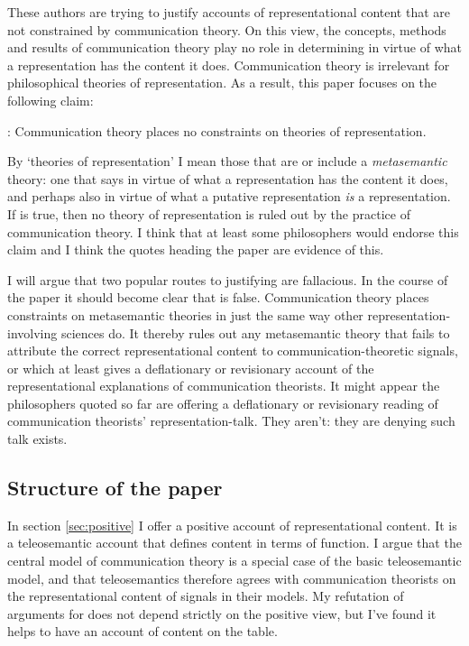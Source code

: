 \documentclass[12pt]{article}
\begin{document}
These authors are trying to justify accounts of representational content that are not constrained by communication theory.
On this view, the concepts, methods and results of communication theory play no role in determining in virtue of what a representation has the content it does.
Communication theory is irrelevant for philosophical theories of representation.
As a result, this paper focuses on the following claim:

\begin{myquote}
\tic{}: Communication theory places no constraints on theories of representation.
\end{myquote}

\noindent By `theories of representation' I mean those that are or include a \textit{metasemantic} theory: one that says in virtue of what a representation has the content it does, and perhaps also in virtue of what a putative representation \textit{is} a representation.
If \tic{} is true, then no theory of representation is ruled out by the practice of communication theory.
I think that at least some philosophers would endorse this claim and I think the quotes heading the paper are evidence of this.

I will argue that two popular routes to justifying \tic{} are fallacious.
In the course of the paper it should become clear that \tic{} is false.
Communication theory places constraints on metasemantic theories in just the same way other representation-involving sciences do.
It thereby rules out any metasemantic theory that fails to attribute the correct representational content to communication-theoretic signals, or which at least gives a deflationary or revisionary account of the representational explanations of communication theorists.
It might appear the philosophers quoted so far are offering a deflationary or revisionary reading of communication theorists' representation-talk. They aren't: they are denying such talk exists.

\subsection{Structure of the paper}

In section \ref{sec:positive} I offer a positive account of representational content.
It is a teleosemantic account that defines content in terms of function.
I argue that the central model of communication theory is a special case of the basic teleosemantic model, and that teleosemantics therefore agrees with communication theorists on the representational content of signals in their models.
My refutation of arguments for \tic{} does not depend strictly on the positive view, but I've found it helps to have an account of content on the table.
\end{document}
